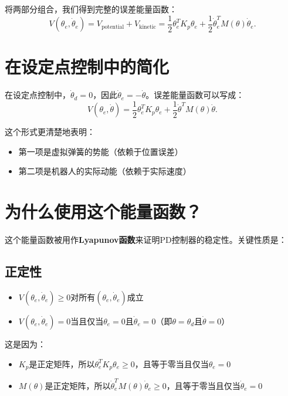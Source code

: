 \documentclass{article}
\begin{document}
将两部分组合，我们得到完整的误差能量函数：
\begin{equation}
V(\theta_e, \dot{\theta}_e) = V_{\text{potential}} + V_{\text{kinetic}} = \frac{1}{2}\theta_e^T K_p\theta_e + \frac{1}{2}\dot{\theta}_e^T M(\theta)\dot{\theta}_e.
\end{equation}

\section{在设定点控制中的简化}

在设定点控制中，$\dot{\theta}_d = 0$，因此$\dot{\theta}_e = -\dot{\theta}$。误差能量函数可以写成：
\begin{equation}
V(\theta_e, \dot{\theta}) = \frac{1}{2}\theta_e^T K_p\theta_e + \frac{1}{2}\dot{\theta}^T M(\theta)\dot{\theta}.
\end{equation}

这个形式更清楚地表明：
\begin{itemize}
\item 第一项是虚拟弹簧的势能（依赖于位置误差）
\item 第二项是机器人的实际动能（依赖于实际速度）
\end{itemize}

\section{为什么使用这个能量函数？}

这个能量函数被用作\textbf{Lyapunov函数}来证明PD控制器的稳定性。关键性质是：

\subsection{正定性}

\begin{itemize}
\item $V(\theta_e, \dot{\theta}_e) \geq 0$对所有$(\theta_e, \dot{\theta}_e)$成立
\item $V(\theta_e, \dot{\theta}_e) = 0$当且仅当$\theta_e = 0$且$\dot{\theta}_e = 0$（即$\theta = \theta_d$且$\dot{\theta} = 0$）
\end{itemize}

这是因为：
\begin{itemize}
\item $K_p$是正定矩阵，所以$\theta_e^T K_p\theta_e \geq 0$，且等于零当且仅当$\theta_e = 0$
\item $M(\theta)$是正定矩阵，所以$\dot{\theta}_e^T M(\theta)\dot{\theta}_e \geq 0$，且等于零当且仅当$\dot{\theta}_e = 0$
\end{itemize}
\end{document}
